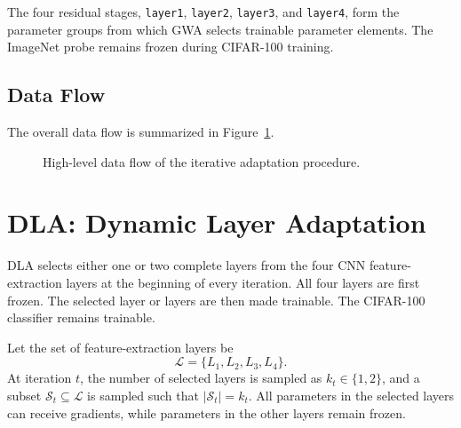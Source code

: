 \documentclass[12pt,a4paper]{report}
\begin{document}
The four residual stages, \texttt{layer1}, \texttt{layer2},
\texttt{layer3}, and \texttt{layer4}, form the parameter groups from
which GWA selects trainable parameter elements. The ImageNet probe
remains frozen during CIFAR-100 training.

\subsection{Data Flow}
The overall data flow is summarized in Figure~\ref{fig:dataflow}.

\begin{figure}[H]
\centering
{}
\caption{High-level data flow of the iterative adaptation procedure.}
\label{fig:dataflow}
\end{figure}

\section{DLA: Dynamic Layer Adaptation}
DLA selects either one or two complete layers from the four CNN
feature-extraction layers at the beginning of every iteration. All
four layers are first frozen. The selected layer or layers are then
made trainable. The CIFAR-100 classifier remains trainable.

Let the set of feature-extraction layers be
\[
\mathcal{L}=\{L_1,L_2,L_3,L_4\}.
\]
At iteration $t$, the number of selected layers is sampled as
$k_t\in\{1,2\}$, and a subset
$\mathcal{S}_t\subseteq\mathcal{L}$ is sampled such that
$|\mathcal{S}_t|=k_t$. All parameters in the selected layers can receive
gradients, while parameters in the other layers remain frozen.
\end{document}
